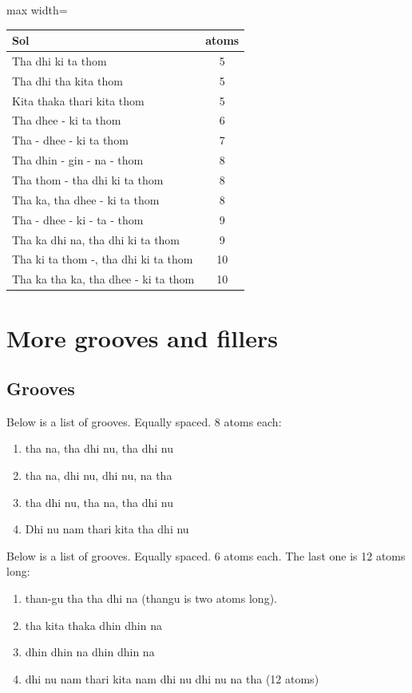 \begin{center}
\begin{adjustbox}{max width=\textwidth}
\begin{tabular}{l c}
\toprule
Sol & atoms\\
\midrule
Tha dhi ki ta thom                  & 5\\
Tha dhi tha kita thom               & 5\\
Kita thaka thari kita thom          & 5\\
Tha dhee - ki ta thom               & 6\\
Tha - dhee - ki ta thom             & 7\\
Tha dhin - gin - na - thom          & 8\\
Tha thom - tha dhi ki ta thom       & 8\\
Tha ka, tha dhee - ki ta thom       & 8\\
Tha - dhee - ki - ta - thom         & 9\\
Tha ka dhi na, tha dhi ki ta thom   & 9\\
Tha ki ta thom -, tha dhi ki ta thom & 10\\
Tha ka tha ka, tha dhee - ki ta thom & 10\\
\bottomrule
\end{tabular}
\end{adjustbox}
\end{center}

\section{More grooves and fillers}

\subsection{Grooves}

Below is a list of grooves. Equally spaced. 8 atoms each:
\begin{enumerate}
  \item tha na, tha dhi nu, tha dhi nu
  \item tha na, dhi nu, dhi nu, na tha
  \item tha dhi nu, tha na, tha dhi nu
  \item Dhi nu nam thari kita tha dhi nu
\end{enumerate}

Below is a list of grooves. Equally spaced. 6 atoms each. The last one is 12 atoms
long:
\begin{enumerate}
  \item than-gu tha tha dhi na (thangu is two atoms long).
  \item tha kita thaka dhin dhin na
  \item dhin dhin na dhin dhin na
  \item dhi nu nam thari kita nam dhi nu dhi nu na tha (12 atoms)
\end{enumerate}

